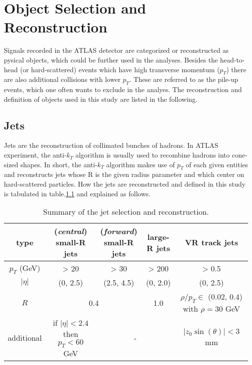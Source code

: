 \documentclass[class=NCU_thesis, crop=false]{standalone}
\begin{document}
\chapter{Object Selection and Reconstruction}
	Signals recorded in the ATLAS detector are categorized or reconstructed as pysical objects, which could be further used in the analyses. Besides the head-to-head (or hard-scattered) events which have high transverse momentum ($p_T$) there are also additional collisions with lower $p_T$. These are referred to as the pile-up events, which one often wants to exclude in the analyes. The reconstruction and definition of objects used in this study are listed in the following.
	
\section{Jets}\label{jet}
	Jets are the reconstruction of collimated bunches of hadrons. In ATLAS experiment, the anti-$k_T$ algorithm is usually used to recombine hadrons into cone-sized shapes. In short, the anti-$k_T$ algorithm makes use of $p_T$ of each given entities and reconstructs jets whose R is the given radius parameter and which center on hard-scattered particles. How the jets are reconstructed and defined in this study is tabulated in table.\ref{tab:jet selection} and explained as follows.
	
	\begin{table}[h]
		\centering
		\caption{Summary of the jet selection and reconstruction.}
		\label{tab:jet selection}
		\begin{tabular}{|c|c|c|c|c|}
			\hline
			type & \shortstack{(\textit{central})\\small-R jets} & \shortstack{(\textit{forward})\\small-R jets} & large-R jets & VR track jets \\ \hline
			$p_T$ (GeV) & > 20 & > 30 & > 200 & > 0.5 \\ \hline
			$\lvert \eta \rvert$ & (0, 2.5) & (2.5, 4.5) & (0, 2.0) & (0, 2.5) \\ \hline
			$R$ & \multicolumn{2}{c|}{0.4} & 1.0 & \shortstack{$\rho / p_T \in$ (0.02, 0.4)\\ with $\rho = 30$ GeV} \\ \hline
			additional & \shortstack{if $\lvert \eta \rvert < 2.4$ then\\$p_T < 60$ GeV} & \multicolumn{2}{c|}{-} & $\lvert z_0 \sin(\theta) \rvert < 3$ mm \\ \hline
		\end{tabular}
	\end{table}
	
\end{document}
